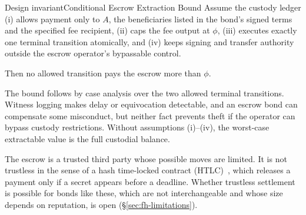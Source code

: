 \documentclass[11pt,a4paper]{article}
\theoremstyle{definition}
\theoremstyle{remark}
\begin{document}
\begin{pdclaim}{Design invariant}{Conditional Escrow Extraction Bound}
\setlength{\parskip}{4pt plus 1pt}
\label{thm:fh-escrow-bound}
Assume the custody ledger (i) allows payment only to $A$, the beneficiaries listed in the bond's signed terms and the specified fee recipient, (ii) caps the fee output at $\phi$, (iii) executes exactly one terminal transition atomically, and (iv) keeps signing and transfer authority outside the escrow operator's bypassable control.

Then no allowed transition pays the escrow more than $\phi$.
\end{pdclaim}

The bound follows by case analysis over the two allowed terminal transitions. Witness logging makes delay or equivocation detectable, and an escrow bond can compensate some misconduct, but neither fact prevents theft if the operator can bypass custody restrictions. Without assumptions (i)--(iv), the worst-case extractable value is the full custodial balance.

The escrow is a trusted third party whose possible moves are limited. It is not trustless in the sense of a hash time-locked contract (HTLC)~, which releases a payment only if a secret appears before a deadline. Whether trustless settlement is possible for bonds like these, which are not interchangeable and whose size depends on reputation, is open (\S\ref{sec:fh-limitations}).
\end{document}
